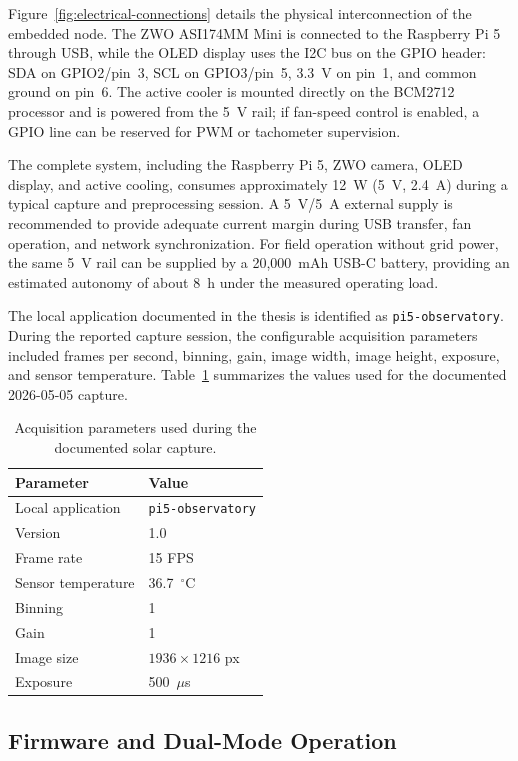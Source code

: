 \documentclass[conference,a4paper]{IEEEtran}
\begin{document}
Figure~\ref{fig:electrical-connections} details the physical interconnection of the embedded node. The ZWO ASI174MM Mini is connected to the Raspberry Pi 5 through USB, while the OLED display uses the I2C bus on the GPIO header: SDA on GPIO2/pin~3, SCL on GPIO3/pin~5, 3.3~V on pin~1, and common ground on pin~6. The active cooler is mounted directly on the BCM2712 processor and is powered from the 5~V rail; if fan-speed control is enabled, a GPIO line can be reserved for PWM or tachometer supervision.

The complete system, including the Raspberry Pi 5, ZWO camera, OLED display, and active cooling, consumes approximately 12~W (5~V, 2.4~A) during a typical capture and preprocessing session. A 5~V/5~A external supply is recommended to provide adequate current margin during USB transfer, fan operation, and network synchronization. For field operation without grid power, the same 5~V rail can be supplied by a 20,000~mAh USB-C battery, providing an estimated autonomy of about 8~h under the measured operating load.


The local application documented in the thesis is identified as \texttt{pi5-observatory}. During the reported capture session, the configurable acquisition parameters included frames per second, binning, gain, image width, image height, exposure, and sensor temperature. Table~\ref{tab:capture-parameters} summarizes the values used for the documented 2026-05-05 capture.

\begin{table}[t]
\caption{Acquisition parameters used during the documented solar capture.}
\label{tab:capture-parameters}
\centering
\begin{tabular}{ll}
\hline
\textbf{Parameter} & \textbf{Value} \\
\hline
Local application & \texttt{pi5-observatory} \\
Version & 1.0 \\
Frame rate & 15 FPS \\
Sensor temperature & 36.7~$^\circ$C \\
Binning & 1 \\
Gain & 1 \\
Image size & $1936\times1216$ px \\
Exposure & 500~$\mu$s \\
\hline
\end{tabular}
\end{table}



\subsection{Firmware and Dual-Mode Operation}
\end{document}
